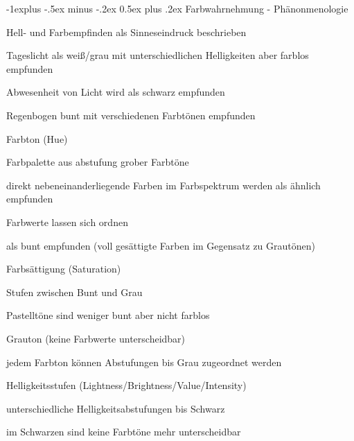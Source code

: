 \documentclass[landscape]{article}
\makeatletter
\renewcommand{\subsection}{\@startsection{subsection}{2}{0mm}%
                                {-1explus -.5ex minus -.2ex}%
                                {0.5ex plus .2ex}%
                                {\normalfont\normalsize\bfseries}}
\makeatother
\begin{document}
\begin{multicols}{3}
  \subsection{Farbwahrnehmung - Phänonmenologie}
  \begin{itemize*}
    \item Hell- und Farbempfinden als Sinneseindruck beschrieben
    \item Tageslicht als weiß/grau mit unterschiedlichen Helligkeiten aber farblos empfunden
    \item Abwesenheit von Licht wird als schwarz empfunden
    \item Regenbogen bunt mit verschiedenen Farbtönen empfunden
  \end{itemize*}
  \begin{description*}
    \item[Farbton] (Hue)
          \begin{itemize*}
            \item Farbpalette aus abstufung grober Farbtöne 
            \item direkt nebeneinanderliegende Farben im Farbspektrum werden als ähnlich empfunden
            \item Farbwerte lassen sich ordnen
            \item als bunt empfunden (voll gesättigte Farben im Gegensatz zu Grautönen)
          \end{itemize*}
    \item[Farbsättigung] (Saturation)
          \begin{itemize*}
            \item Stufen zwischen Bunt und Grau
            \item Pastelltöne sind weniger bunt aber nicht farblos
            \item Grauton (keine Farbwerte unterscheidbar)
            \item jedem Farbton können Abstufungen bis Grau zugeordnet werden
          \end{itemize*}
    \item[Helligkeitsstufen] (Lightness/Brightness/Value/Intensity)
          \begin{itemize*}
            \item unterschiedliche Helligkeitsabstufungen bis Schwarz
            \item im Schwarzen sind keine Farbtöne mehr unterscheidbar
          \end{itemize*}
  \end{description*}
  

\end{multicols}
\end{document}
